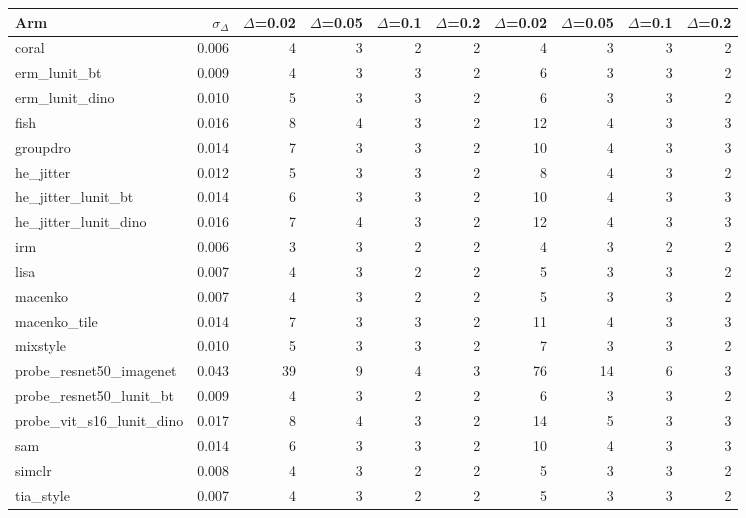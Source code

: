 \begin{tabular}{lrrrrrrrrr}
\toprule
Arm & $\sigma_\Delta$ & $\Delta$=0.02 & $\Delta$=0.05 & $\Delta$=0.1 & $\Delta$=0.2 & $\Delta$=0.02 & $\Delta$=0.05 & $\Delta$=0.1 & $\Delta$=0.2 \\
\midrule
coral & 0.006 & 4 & 3 & 2 & 2 & 4 & 3 & 3 & 2 \\
erm\_lunit\_bt & 0.009 & 4 & 3 & 3 & 2 & 6 & 3 & 3 & 2 \\
erm\_lunit\_dino & 0.010 & 5 & 3 & 3 & 2 & 6 & 3 & 3 & 2 \\
fish & 0.016 & 8 & 4 & 3 & 2 & 12 & 4 & 3 & 3 \\
groupdro & 0.014 & 7 & 3 & 3 & 2 & 10 & 4 & 3 & 3 \\
he\_jitter & 0.012 & 5 & 3 & 3 & 2 & 8 & 4 & 3 & 2 \\
he\_jitter\_lunit\_bt & 0.014 & 6 & 3 & 3 & 2 & 10 & 4 & 3 & 3 \\
he\_jitter\_lunit\_dino & 0.016 & 7 & 4 & 3 & 2 & 12 & 4 & 3 & 3 \\
irm & 0.006 & 3 & 3 & 2 & 2 & 4 & 3 & 2 & 2 \\
lisa & 0.007 & 4 & 3 & 2 & 2 & 5 & 3 & 3 & 2 \\
macenko & 0.007 & 4 & 3 & 2 & 2 & 5 & 3 & 3 & 2 \\
macenko\_tile & 0.014 & 7 & 3 & 3 & 2 & 11 & 4 & 3 & 3 \\
mixstyle & 0.010 & 5 & 3 & 3 & 2 & 7 & 3 & 3 & 2 \\
probe\_resnet50\_imagenet & 0.043 & 39 & 9 & 4 & 3 & 76 & 14 & 6 & 3 \\
probe\_resnet50\_lunit\_bt & 0.009 & 4 & 3 & 2 & 2 & 6 & 3 & 3 & 2 \\
probe\_vit\_s16\_lunit\_dino & 0.017 & 8 & 4 & 3 & 2 & 14 & 5 & 3 & 3 \\
sam & 0.014 & 6 & 3 & 3 & 2 & 10 & 4 & 3 & 3 \\
simclr & 0.008 & 4 & 3 & 2 & 2 & 5 & 3 & 3 & 2 \\
tia\_style & 0.007 & 4 & 3 & 2 & 2 & 5 & 3 & 3 & 2 \\
\bottomrule
\end{tabular}

